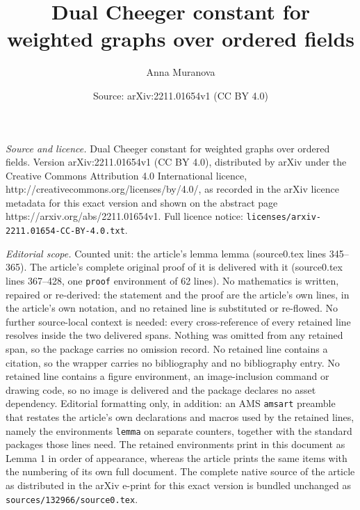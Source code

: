 \documentclass[10pt,a4paper]{amsart}
\title{Dual Cheeger constant for weighted graphs over ordered fields}
\author{Anna Muranova}
\date{Source: arXiv:2211.01654v1 (CC BY 4.0)}
\begin{document}
\maketitle

\noindent\emph{Source and licence.} Dual Cheeger constant for weighted graphs over ordered fields. Version arXiv:2211.01654v1 (CC BY 4.0), distributed by arXiv under the Creative Commons Attribution 4.0 International licence, http://creativecommons.org/licenses/by/4.0/, as recorded in the arXiv licence metadata for this exact version and shown on the abstract page https://arxiv.org/abs/2211.01654v1. Full licence notice: \texttt{licenses/arxiv-2211.01654-CC-BY-4.0.txt}.\par\smallskip

\noindent\textit{Editorial scope.} Counted unit: the article's lemma lemma (source0.tex lines 345--365). The article's complete original proof of it is delivered with it (source0.tex lines 367--428, one \texttt{proof} environment of 62 lines). No mathematics is written, repaired or re-derived: the statement and the proof are the article's own lines, in the article's own notation, and no retained line is substituted or re-flowed.  No further source-local context is needed: every cross-reference of every retained line resolves inside the two delivered spans.  Nothing was omitted from any retained span, so the package carries no omission record.  No retained line contains a citation, so the wrapper carries no bibliography and no bibliography entry.  No retained line contains a figure environment, an image-inclusion command or drawing code, so no image is delivered and the package declares no asset dependency.  Editorial formatting only, in addition: an AMS \texttt{amsart} preamble that restates the article's own declarations and macros used by the retained lines, namely the environments \texttt{lemma} on separate counters, together with the standard packages those lines need.  The retained environments print in this document as Lemma 1 in order of appearance, whereas the article prints the same items with the numbering of its own full document.  The complete native source of the article as distributed in the arXiv e-print for this exact version is bundled unchanged as \texttt{sources/132966/source0.tex}.
\end{document}
